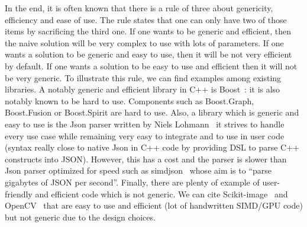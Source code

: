 
In the end, it is often known that there is a rule of three about genericity, efficiency and ease of use. The rule
states that one can only have two of those items by sacrificing the third one. If one wants to be generic and efficient,
then the naive solution will be very complex to use with lots of parameters. If one wants a solution to be generic and
easy to use, then it will be not very efficient by default. If one wants a solution to be easy to use and efficient then
it will not be very generic. To illustrate this rule, we can find examples among existing libraries. A notably generic
and efficient library in C++ is Boost~\parencite{boost.2021}: it is also notably known to be hard to use. Components
such as Boost.Graph, Boost.Fusion or Boost.Spirit are hard to use. Also, a library which is generic and easy to use is
the Json parser written by Niels Lohmann~\parencite{nlohmann.2021.json} it strives to handle every use case while
remaining very easy to integrate and to use in user code (syntax really close to native Json in C++ code by providing
DSL to parse C++ constructs into JSON). However, this has a cost and the parser is slower than Json parser optimized for
speed such as simdjson~\parencite{lemire.2021.simdjson} whose aim is to ``parse gigabytes of JSON per second''. Finally,
there are plenty of example of user-friendly and efficient code which is not generic. We can cite
Scikit-image~\parencite{vanderwalt.2014.skimage} and OpenCV~\parencite{bradski.2000.opencv} that are easy to use and
efficient (lot of handwritten SIMD/GPU code) but not generic due to the design choices.

